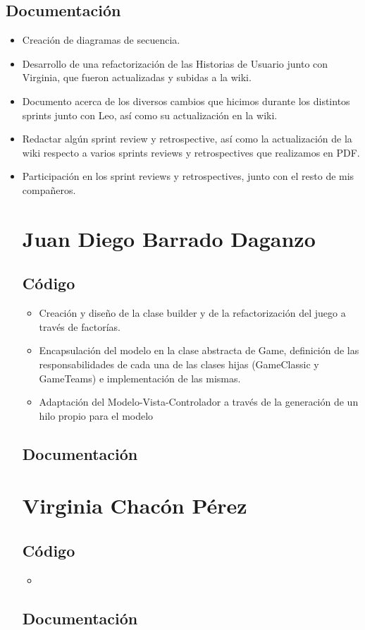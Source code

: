 \documentclass[../FINAL/Scrum/SCRUM.tex]{subfiles}
\begin{document}
\subsection*{Documentación}
\begin{itemize}
\item Creación de diagramas de secuencia.
\item Desarrollo de una refactorización de las Historias de Usuario junto con Virginia, que fueron actualizadas y subidas a la wiki.
\item Documento acerca de los diversos cambios que hicimos durante los distintos sprints junto con Leo, así como su actualización en la wiki.
\item Redactar algún sprint review y retrospective, así como la actualización de la wiki respecto a varios sprints reviews y retrospectives que realizamos en PDF.
\item Participación en los sprint reviews y retrospectives, junto con el resto de mis compañeros.

\section{Juan Diego Barrado Daganzo}
\subsection*{Código}
\begin{itemize}
\item Creación y diseño de la clase builder y de la refactorización del juego a través de factorías.
\item Encapsulación del modelo en la clase abstracta de Game, definición de las responsabilidades de cada una de las clases hijas (GameClassic y GameTeams) e implementación de las mismas.
\item Adaptación del Modelo-Vista-Controlador a través de la generación de un hilo propio para el modelo
\end{itemize}
\subsection*{Documentación}

\section{Virginia Chacón Pérez}
\subsection*{Código}
\begin{itemize}
\item 
\end{itemize}
\subsection*{Documentación}



\end{itemize}
\end{document}
